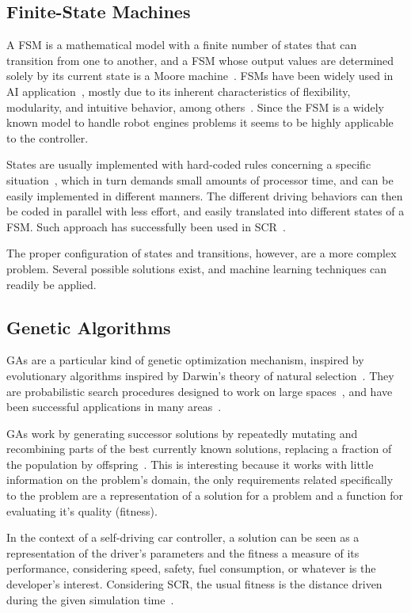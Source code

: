 \subsection{Finite-State Machines}%
A FSM is a mathematical model with a finite number of states that can transition from one to another, and a FSM whose output values are determined solely by its current state is a Moore machine~\cite{Ajzerman}. FSMs have been widely used in AI application~\cite{Millington:2006:FSM}, mostly due to its inherent characteristics of flexibility, modularity, and intuitive behavior, among others~\cite{Buckland:2005:AI}. Since the FSM is a widely known model to handle robot engines problems it seems to be highly applicable to the controller. 

States are usually implemented with hard-coded rules concerning a specific situation~\cite{Buckland:2005:AI}, which in turn demands small amounts of processor time, and can be easily implemented in different manners. The different driving behaviors can then be coded in parallel with less effort, and easily translated into different states of a FSM. Such approach has successfully been used in SCR~\cite{2009,DIEGO}.

The proper configuration of states and transitions, however, are a more complex problem. Several possible solutions exist, and machine learning techniques can readily be applied.

\subsection{Genetic Algorithms}

GAs are a particular kind of genetic optimization mechanism, inspired by evolutionary algorithms inspired by Darwin's theory of natural selection~\cite{GA}. They are probabilistic search procedures designed to work on large spaces~\cite{goldberg1988}, and have been successful applications in many areas~\cite{GABIO,GAECO,stanley_real-time_2005,pedrycz_genetic_2005}.

GAs work by generating successor solutions by repeatedly mutating and recombining parts of the best currently known solutions, replacing a fraction of the population by offspring~\cite{mitchell_1997}. This is interesting because it works with little information on the problem's domain, the only requirements related specifically to the problem are a representation of a solution for a problem and a function for evaluating it's quality (fitness).

In the context of a self-driving car controller, a solution can be seen as a representation of the driver's parameters and the fitness a measure of its performance, considering speed, safety, fuel consumption, or whatever is the developer's interest. Considering SCR, the usual fitness is the distance driven during the given simulation time~\cite{2009}.

